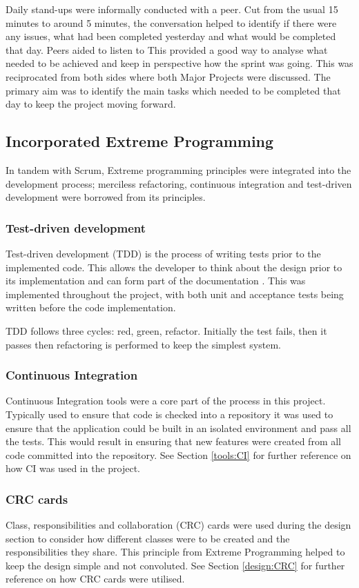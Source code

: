 Daily stand-ups were informally conducted with a peer. Cut from the usual 15 minutes to around 5 minutes, the conversation helped to identify if there were any issues, what had been completed yesterday and what would be completed that day. Peers aided to listen to This provided a good way to analyse what needed to be achieved and keep in perspective how the sprint was going. This was reciprocated from both sides where both Major Projects were discussed. The primary aim was to identify the main tasks which needed to be completed that day to keep the project moving forward.

\subsection{Incorporated Extreme Programming}
In tandem with Scrum, Extreme programming \cite{citeulike:13915786} principles were integrated into the development process; merciless refactoring, continuous integration and test-driven development were borrowed from its principles.

\subsubsection{Test-driven development}
Test-driven development (TDD) is the process of writing tests prior to the implemented code. This allows the developer to think about the design prior to its implementation and can form part of the documentation \cite{citeulike:14014361}. This was implemented throughout the project, with both unit and acceptance tests being written before the code implementation.

TDD follows three cycles: red, green, refactor. Initially the test fails, then it passes then refactoring is performed to keep the simplest system.

\subsubsection{Continuous Integration}
Continuous Integration tools were a core part of the process in this project. Typically used to ensure that code is checked into a repository it was used to ensure that the application could be built in an isolated environment and pass all the tests. This would result in ensuring that new features were created from all code committed into the repository. See Section \ref{tools:CI} for further reference on how CI was used in the project.

\subsubsection{CRC cards}
Class, responsibilities and collaboration (CRC) cards \cite{citeulike:13398676} were used during the design section to consider how different classes were to be created and the responsibilities they share. This principle from Extreme Programming helped to keep the design simple and not convoluted. See Section \ref{design:CRC} for further reference on how CRC cards were utilised.
